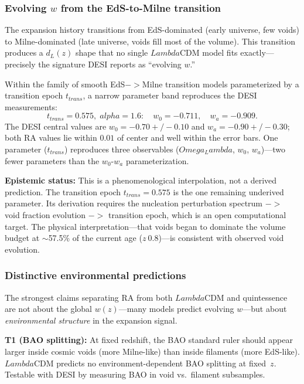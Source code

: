 \documentclass[11pt]{article}
\def\Lambda{Lambda}%
\def\Omega{Omega}%
\def\alpha{alpha}%
\def\mathrm#1{#1}%
\def\approx{~}%
\def\to{->}%
\def\pm{+/-}%
\begin{document}
\subsubsection{Evolving $w$ from the EdS-to-Milne transition}

The expansion history transitions from EdS-dominated (early universe, few voids) to Milne-dominated (late universe, voids fill most of the volume). This transition produces a $d_L(z)$ shape that no single $\Lambda$CDM model fits exactly---precisely the signature DESI reports as ``evolving $w$.''

Within the family of smooth EdS$\to$Milne transition models parameterized by a transition epoch $t_{\mathrm{trans}}$, a narrow parameter band reproduces the DESI measurements:
\begin{equation}
t_{\mathrm{trans}}=0.575,\; \alpha=1.6: \quad w_0=-0.711,\quad w_a=-0.909.
\end{equation}
The DESI central values are $w_0=-0.70\pm 0.10$ and $w_a=-0.90\pm 0.30$; both RA values lie within $0.01$ of center and well within the error bars. One parameter ($t_{\mathrm{trans}}$) reproduces three observables ($\Omega_\Lambda$, $w_0$, $w_a$)---two fewer parameters than the $w_0$-$w_a$ parameterization.

\textbf{Epistemic status:} This is a phenomenological interpolation, not a derived prediction. The transition epoch $t_{\mathrm{trans}}=0.575$ is the one remaining underived parameter. Its derivation requires the nucleation perturbation spectrum $\to$ void fraction evolution $\to$ transition epoch, which is an open computational target. The physical interpretation---that voids began to dominate the volume budget at $\sim$57.5\% of the current age ($z\approx 0.8$)---is consistent with observed void evolution.

\subsubsection{Distinctive environmental predictions}

The strongest claims separating RA from both $\Lambda$CDM and quintessence are not about the global $w(z)$---many models predict evolving $w$---but about \emph{environmental structure} in the expansion signal.

\textbf{T1 (BAO splitting):} At fixed redshift, the BAO standard ruler should appear larger inside cosmic voids (more Milne-like) than inside filaments (more EdS-like). $\Lambda$CDM predicts no environment-dependent BAO splitting at fixed~$z$. Testable with DESI by measuring BAO in void vs.\ filament subsamples.
\end{document}
